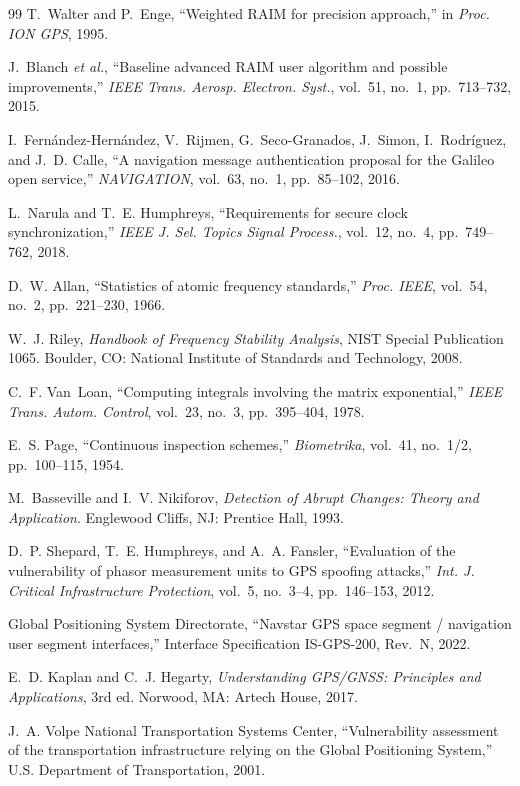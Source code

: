 \documentclass[conference]{IEEEtran}
\begin{document}
\begin{thebibliography}{99}
 T.~Walter and P.~Enge, ``Weighted RAIM for precision approach,''
in \emph{Proc. ION GPS}, 1995.

 J.~Blanch \emph{et al.}, ``Baseline advanced RAIM user algorithm
and possible improvements,'' \emph{IEEE Trans. Aerosp. Electron. Syst.}, vol.~51,
no.~1, pp.~713--732, 2015.

 I.~Fern\'andez-Hern\'andez, V.~Rijmen, G.~Seco-Granados, J.~Simon,
I.~Rodr\'iguez, and J.~D. Calle, ``A navigation message authentication proposal for
the Galileo open service,'' \emph{NAVIGATION}, vol.~63, no.~1, pp.~85--102, 2016.

 L.~Narula and T.~E. Humphreys, ``Requirements for secure clock
synchronization,'' \emph{IEEE J. Sel. Topics Signal Process.}, vol.~12, no.~4,
pp.~749--762, 2018.

 D.~W. Allan, ``Statistics of atomic frequency standards,''
\emph{Proc. IEEE}, vol.~54, no.~2, pp.~221--230, 1966.

 W.~J. Riley, \emph{Handbook of Frequency Stability Analysis},
NIST Special Publication 1065. Boulder, CO: National Institute of Standards and
Technology, 2008.

 C.~F. Van~Loan, ``Computing integrals involving the matrix
exponential,'' \emph{IEEE Trans. Autom. Control}, vol.~23, no.~3, pp.~395--404,
1978.

 E.~S. Page, ``Continuous inspection schemes,'' \emph{Biometrika},
vol.~41, no.~1/2, pp.~100--115, 1954.

 M.~Basseville and I.~V. Nikiforov, \emph{Detection of Abrupt
Changes: Theory and Application}. Englewood Cliffs, NJ: Prentice Hall, 1993.

 D.~P. Shepard, T.~E. Humphreys, and A.~A. Fansler, ``Evaluation
of the vulnerability of phasor measurement units to GPS spoofing attacks,''
\emph{Int. J. Critical Infrastructure Protection}, vol.~5, no.~3--4,
pp.~146--153, 2012.

 Global Positioning System Directorate, ``Navstar GPS space
segment / navigation user segment interfaces,'' Interface Specification
IS-GPS-200, Rev.~N, 2022.

 E.~D. Kaplan and C.~J. Hegarty, \emph{Understanding GPS/GNSS:
Principles and Applications}, 3rd ed. Norwood, MA: Artech House, 2017.

 J.~A. Volpe National Transportation Systems Center,
``Vulnerability assessment of the transportation infrastructure relying on the
Global Positioning System,'' U.S. Department of Transportation, 2001.


\end{thebibliography}
\end{document}
